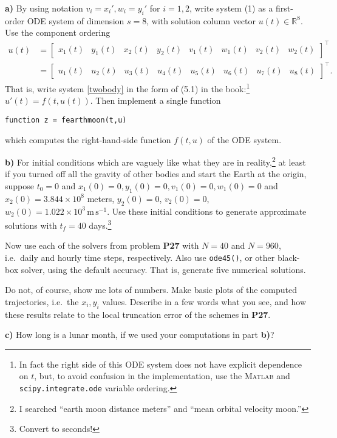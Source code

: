\documentclass[12pt]{amsart}
\newcommand{\RR}{\mathbb{R}}
\newcommand{\Matlab}{\textsc{Matlab}\xspace}
\newcommand{\epart}[1]{\medskip\noindent\textbf{#1)}\quad }
\begin{document}
\epart{a} By using notation $v_i=x_i', w_i=y_i'$ for $i=1,2$, write system (1) as a first-order ODE system of dimension $s=8$, with solution column vector $u(t)\in\RR^8$.  Use the component ordering
\begin{align*}
u(t) &= \begin{bmatrix} x_1(t) & y_1(t) & x_2(t) & y_2(t) & v_1(t) & w_1(t) & v_2(t) & w_2(t) \end{bmatrix}^\top \\
     &= \begin{bmatrix} u_1(t) & u_2(t) & u_3(t) & u_4(t) & u_5(t) & u_6(t) & u_7(t) & u_8(t) \end{bmatrix}^\top.
\end{align*}
That is, write system \eqref{twobody} in the form of (5.1) in the book:\footnote{In fact the right side of this ODE system does not have explicit dependence on $t$, but, to avoid confusion in the implementation, use the \Matlab and \texttt{scipy.integrate.ode} variable ordering.} $u'(t) = f(t,u(t))$.  Then implement a single function

\centerline{\texttt{function z = fearthmoon(t,u)}}

\noindent which computes the right-hand-side function $f(t,u)$ of the ODE system.

\epart{b}  For initial conditions which are vaguely like what they are in reality,\footnote{I searched ``earth moon distance meters'' and ``mean orbital velocity moon.''} at least if you turned off all the gravity of other bodies and start the Earth at the origin, suppose $t_0=0$ and $x_1(0)=0,y_1(0)=0,v_1(0)=0,w_1(0)=0$ and $x_2(0)=3.844\times 10^8$ meters, $y_2(0)=0$, $v_2(0)=0$, $w_2(0)=1.022\times 10^3 \,\text{m}\,\text{s}^{-1}$.  Use these initial conditions to generate approximate solutions with $t_f=40$ days.\footnote{Convert to seconds!}

Now use each of the solvers from problem \textbf{P27} with $N=40$ and $N=960$, i.e.~daily and hourly time steps, respectively.  Also use \texttt{ode45()}, or other black-box solver, using the default accuracy.  That is, generate five numerical solutions.

Do not, of course, show me lots of numbers.  Make basic plots of the computed trajectories, i.e.~the $x_i,y_i$ values.  Describe in a few words what you see, and how these results relate to the local truncation error of the schemes in \textbf{P27}.

\epart{c}  How long is a lunar month, if we used your computations in part \textbf{b)}?  
\end{document}
